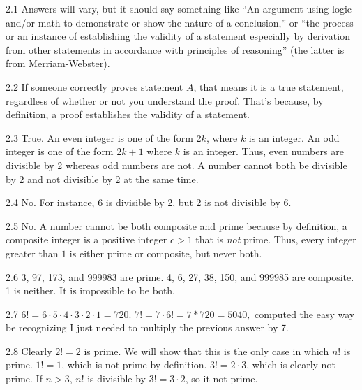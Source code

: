 \begin{RequAnswer}{2.1}
Answers will vary, but it should say something like
``An argument using logic and/or math to demonstrate or show the nature of a conclusion,''
or
``the process or an instance of establishing the validity of a statement especially by derivation
from other statements in accordance with principles of reasoning'' (the latter is from Merriam-Webster).
\end{RequAnswer}
\begin{RequAnswer}{2.2}
If someone correctly proves statement $A$, that means it is a true statement, regardless of whether or not
you understand the proof.  That's because, by definition, a proof establishes the validity of a statement.
\end{RequAnswer}
\begin{RequAnswer}{2.3}
True. An even integer is one of the form $2k$, where $k$ is an integer.
An odd integer is one of the form $2k + 1$ where $k$ is an integer.
Thus, even numbers are divisible by 2 whereas odd numbers are not.
A number cannot both be divisible by 2 and not divisible by 2 at the same time.
\end{RequAnswer}
\begin{RequAnswer}{2.4}
No. For instance, 6 is divisible by 2, but 2 is not divisible by 6.
\end{RequAnswer}
\begin{RequAnswer}{2.5}
No.
A number cannot be both composite and prime because by definition,
a composite integer is a positive integer $c>1$ that is {\em not} prime.
Thus, every integer greater than $1$ is either prime or composite, but never both.
\end{RequAnswer}
\begin{RequAnswer}{2.6}
3, 97, 173, and 999983 are prime.
4, 6, 27, 38, 150, and 999985 are composite.
1 is neither. It is impossible to be both.
\end{RequAnswer}
\begin{RequAnswer}{2.7}
$6!=6\cdot 5\cdot 4\cdot 3\cdot 2\cdot 1 = 720$.
$7!=7\cdot 6! = 7*720 =5040,$ computed the easy way
be recognizing I just needed to multiply the previous answer by 7.
\end{RequAnswer}
\begin{RequAnswer}{2.8}
Clearly $2!=2$ is prime.
We will show that this is the only case in which $n!$ is prime.
$1!=1$, which is not prime by definition.
$3!=2\cdot 3$, which is clearly not prime.
If $n>3$, $n!$ is divisible by $3!=3\cdot 2$, so it not prime.
\end{RequAnswer}
